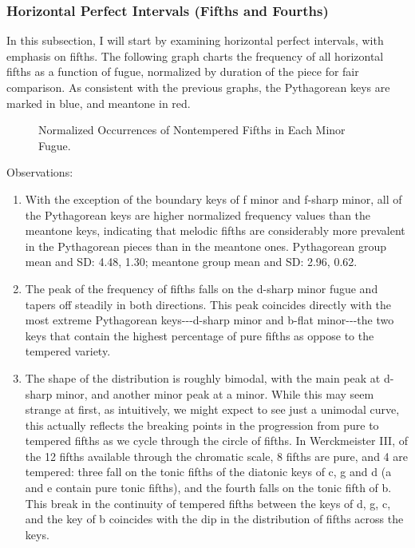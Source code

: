     \subsubsection{Horizontal Perfect Intervals (Fifths and
Fourths)}\label{horizontal-perfect-intervals-fifths-and-fourths}

In this subsection, I will start by examining horizontal perfect
intervals, with emphasis on fifths. The following graph charts the
frequency of all horizontal fifths as a function of fugue, normalized by
duration of the piece for fair comparison. As consistent with the
previous graphs, the Pythagorean keys are marked in blue, and meantone
in red.




\begin{figure}[H]
    \begin{center}
    \caption{Normalized Occurrences of Nontempered Fifths in Each Minor Fugue. }
    \end{center}
\end{figure}
    
    Observations:

\begin{enumerate}
\def\labelenumi{\arabic{enumi}.}
\tightlist
\item
  With the exception of the boundary keys of f minor and f-sharp minor,
  all of the Pythagorean keys are higher normalized frequency values
  than the meantone keys, indicating that melodic fifths are
  considerably more prevalent in the Pythagorean pieces than in the
  meantone ones. Pythagorean group mean and SD: 4.48, 1.30; meantone
  group mean and SD: 2.96, 0.62.
\item
  The peak of the frequency of fifths falls on the d-sharp minor fugue
  and tapers off steadily in both directions. This peak coincides
  directly with the most extreme Pythagorean keys-\/-\/-d-sharp minor
  and b-flat minor-\/-\/-the two keys that contain the highest
  percentage of pure fifths as oppose to the tempered variety.
\item
  The shape of the distribution is roughly bimodal, with the main peak
  at d-sharp minor, and another minor peak at a minor. While this may
  seem strange at first, as intuitively, we might expect to see just a
  unimodal curve, this actually reflects the breaking points in the
  progression from pure to tempered fifths as we cycle through the
  circle of fifths. In Werckmeister III, of the 12 fifths available
  through the chromatic scale, 8 fifths are pure, and 4 are tempered:
  three fall on the tonic fifths of the diatonic keys of c, g and d (a
  and e contain pure tonic fifths), and the fourth falls on the tonic
  fifth of b. This break in the continuity of tempered fifths between
  the keys of d, g, c, and the key of b coincides with the dip in the
  distribution of fifths across the keys.
\end{enumerate}

